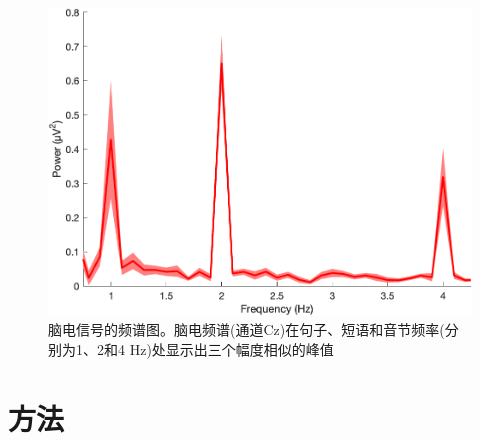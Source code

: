 \documentclass[jou,12pt,floatsintext]{apa7} %
\begin{document}
\begin{figure}[!hbt]
    \vspace{0.5em}
    \centering    
    \vspace{-0.5em}
    \includegraphics[width=0.95\linewidth]{figure/fig1.png}
    \captionsetup{labelsep=period}
    \caption{\small\rm 脑电信号的频谱图。脑电频谱(通道Cz)在句子、短语和音节频率(分别为1、2和4 Hz)处显示出三个幅度相似的峰值}
    \label{fig:fig1}

\end{figure}

\section{方法}
\end{document}
